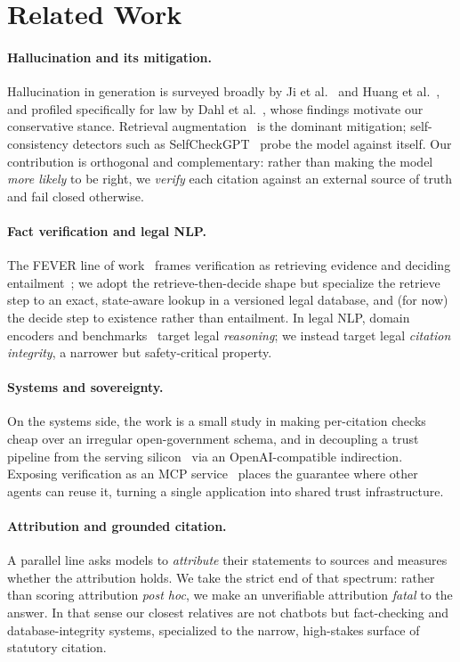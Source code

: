 \section{Related Work}
\label{sec:related}

\paragraph{Hallucination and its mitigation.}
Hallucination in generation is surveyed broadly by Ji et
al.~\cite{ji2023hallucination} and Huang et al.~\cite{huang2025hallucination},
and profiled specifically for law by Dahl et al.~\cite{dahl2024legalfictions},
whose findings motivate our conservative stance. Retrieval
augmentation~\cite{lewis2020rag, gao2023ragsurvey, karpukhin2020dpr} is the
dominant mitigation; self-consistency detectors such as
SelfCheckGPT~\cite{manakul2023selfcheckgpt} probe the model against itself. Our
contribution is orthogonal and complementary: rather than making the model
\emph{more likely} to be right, we \emph{verify} each citation against an
external source of truth and fail closed otherwise.

\paragraph{Fact verification and legal NLP.}
The FEVER line of work~\cite{thorne2018fever} frames verification as retrieving
evidence and deciding entailment~\cite{williams2018mnli}; we adopt the
retrieve-then-decide shape but specialize the retrieve step to an exact,
state-aware lookup in a versioned legal database, and (for now) the decide step
to existence rather than entailment. In legal NLP, domain encoders and
benchmarks~\cite{chalkidis2020legalbert, guha2023legalbench} target legal
\emph{reasoning}; we instead target legal \emph{citation integrity}, a narrower
but safety-critical property.

\paragraph{Systems and sovereignty.}
On the systems side, the work is a small study in making per-citation checks
cheap over an irregular open-government schema, and in decoupling a trust
pipeline from the serving silicon~\cite{modularmax2024, qualcommcloudai100} via
an OpenAI-compatible indirection. Exposing verification as an MCP
service~\cite{mcp2024} places the guarantee where other agents can reuse it,
turning a single application into shared trust infrastructure.

\paragraph{Attribution and grounded citation.}
A parallel line asks models to \emph{attribute} their statements to sources and
measures whether the attribution holds. We take the strict end of that
spectrum: rather than scoring attribution \emph{post hoc}, we make an
unverifiable attribution \emph{fatal} to the answer. In that sense our closest
relatives are not chatbots but fact-checking and database-integrity systems,
specialized to the narrow, high-stakes surface of statutory citation.
